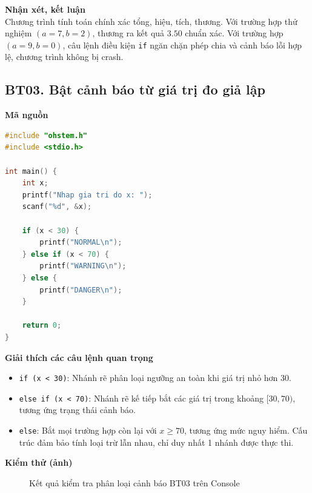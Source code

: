 \noindent\textbf{Nhận xét, kết luận}\\
Chương trình tính toán chính xác tổng, hiệu, tích, thương. Với trường hợp thử nghiệm $(a=7, b=2)$, thương ra kết quả $3.50$ chuẩn xác. Với trường hợp $(a=9, b=0)$, câu lệnh điều kiện \texttt{if} ngăn chặn phép chia và cảnh báo lỗi hợp lệ, chương trình không bị crash.


\subsection*{BT03. Bật cảnh báo từ giá trị đo giả lập}

\noindent\textbf{Mã nguồn}\\
\begin{lstlisting}[language=C]
#include "ohstem.h"
#include <stdio.h>

int main() {
    int x;
    printf("Nhap gia tri do x: ");
    scanf("%d", &x);

    if (x < 30) {
        printf("NORMAL\n");
    } else if (x < 70) {
        printf("WARNING\n");
    } else {
        printf("DANGER\n");
    }

    return 0;
}
\end{lstlisting}

\noindent\textbf{Giải thích các câu lệnh quan trọng}\\
\begin{itemize}
    \item \texttt{if (x < 30)}: Nhánh rẽ phân loại ngưỡng an toàn khi giá trị nhỏ hơn 30.
    \item \texttt{else if (x < 70)}: Nhánh rẽ kế tiếp bắt các giá trị trong khoảng $[30, 70)$, tương ứng trạng thái cảnh báo.
    \item \texttt{else}: Bắt mọi trường hợp còn lại với $x \ge 70$, tương ứng mức nguy hiểm. Cấu trúc đảm bảo tính loại trừ lẫn nhau, chỉ duy nhất 1 nhánh được thực thi.
\end{itemize}

\noindent\textbf{Kiểm thử (ảnh)}\\
\begin{figure}[H]
    \centering
    \caption{Kết quả kiểm tra phân loại cảnh báo BT03 trên Console}
    \label{fig:bt03}
\end{figure}

